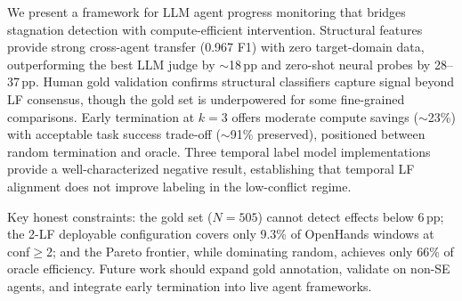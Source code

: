 \documentclass[11pt,a4paper]{article}
\begin{document}
We present a framework for LLM agent progress monitoring that bridges stagnation detection with compute-efficient intervention.
Structural features provide strong cross-agent transfer (0.967 F1) with zero target-domain data, outperforming the best LLM judge by ${\sim}$18\,pp and zero-shot neural probes by 28--37\,pp.
Human gold validation confirms structural classifiers capture signal beyond LF consensus, though the gold set is underpowered for some fine-grained comparisons.
Early termination at $k{=}3$ offers moderate compute savings (${\sim}$23\%) with acceptable task success trade-off (${\sim}$91\% preserved), positioned between random termination and oracle.
Three temporal label model implementations provide a well-characterized negative result, establishing that temporal LF alignment does not improve labeling in the low-conflict regime.

Key honest constraints: the gold set ($N{=}505$) cannot detect effects below 6\,pp; the 2-LF deployable configuration covers only 9.3\% of OpenHands windows at conf${\geq}$2; and the Pareto frontier, while dominating random, achieves only 66\% of oracle efficiency.
Future work should expand gold annotation, validate on non-SE agents, and integrate early termination into live agent frameworks.


\end{document}
